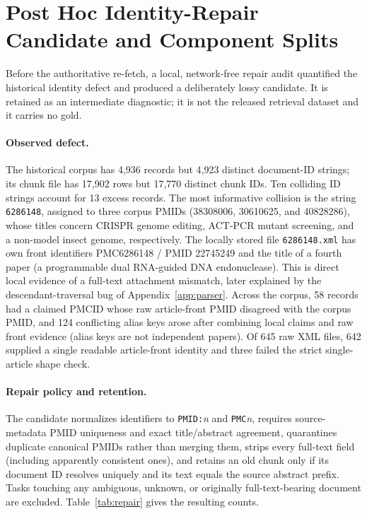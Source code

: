 \section{Post Hoc Identity-Repair Candidate and Component Splits}
\label{app:repair}
Before the authoritative re-fetch, a local, network-free repair audit quantified the historical identity defect and produced a deliberately lossy candidate. It is retained as an intermediate diagnostic; it is not the released retrieval dataset and it carries no gold.

\paragraph{Observed defect.}
The historical corpus has 4,936 records but 4,923 distinct document-ID strings; its chunk file has 17,902 rows but 17,770 distinct chunk IDs. Ten colliding ID strings account for 13 excess records. The most informative collision is the string \texttt{6286148}, assigned to three corpus PMIDs (38308006, 30610625, and 40828286), whose titles concern CRISPR genome editing, ACT-PCR mutant screening, and a non-model insect genome, respectively. The locally stored file \texttt{6286148.xml} has own front identifiers PMC6286148 / PMID 22745249 and the title of a fourth paper (a programmable dual RNA-guided DNA endonuclease). This is direct local evidence of a full-text attachment mismatch, later explained by the descendant-traversal bug of Appendix~\ref{app:parser}. Across the corpus, 58 records had a claimed PMCID whose raw article-front PMID disagreed with the corpus PMID, and 124 conflicting alias keys arose after combining local claims and raw front evidence (alias keys are not independent papers). Of 645 raw XML files, 642 supplied a single readable article-front identity and three failed the strict single-article shape check.

\paragraph{Repair policy and retention.}
The candidate normalizes identifiers to \texttt{PMID:}\emph{n} and \texttt{PMC}\emph{n}, requires source-metadata PMID uniqueness and exact title/abstract agreement, quarantines duplicate canonical PMIDs rather than merging them, strips every full-text field (including apparently consistent ones), and retains an old chunk only if its document ID resolves uniquely and its text equals the source abstract prefix. Tasks touching any ambiguous, unknown, or originally full-text-bearing document are excluded. Table~\ref{tab:repair} gives the resulting counts.

